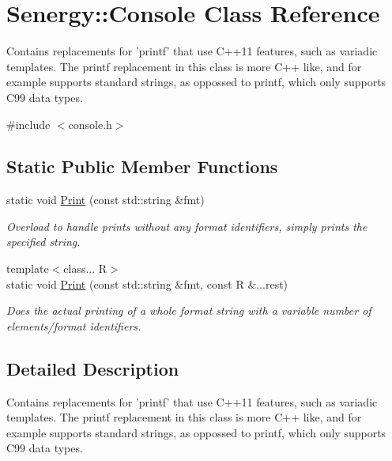 \hypertarget{class_senergy_1_1_console}{\section{Senergy\-:\-:Console Class Reference}
\label{class_senergy_1_1_console}
}


Contains replacements for 'printf' that use C++11 features, such as variadic templates. The printf replacement in this class is more C++ like, and for example supports standard strings, as oppossed to printf, which only supports C99 data types.  




{\ttfamily \#include $<$console.\-h$>$}

\subsection*{Static Public Member Functions}
\begin{DoxyCompactItemize}
\item 
static void \hyperlink{class_senergy_1_1_console_aa4830ba54c4a255bd4bca8b685322dc8}{Print} (const std\-::string \&fmt)
\begin{DoxyCompactList}\small\item\em Overload to handle prints without any format identifiers, simply prints the specified string. \end{DoxyCompactList}\item 
{\footnotesize template$<$class... R$>$ }\\static void \hyperlink{class_senergy_1_1_console_adbdfcc53b64c164bdad1aa6fc739c252}{Print} (const std\-::string \&fmt, const R \&...rest)
\begin{DoxyCompactList}\small\item\em Does the actual printing of a whole format string with a variable number of elements/format identifiers. \end{DoxyCompactList}\end{DoxyCompactItemize}


\subsection{Detailed Description}
Contains replacements for 'printf' that use C++11 features, such as variadic templates. The printf replacement in this class is more C++ like, and for example supports standard strings, as oppossed to printf, which only supports C99 data types. 

